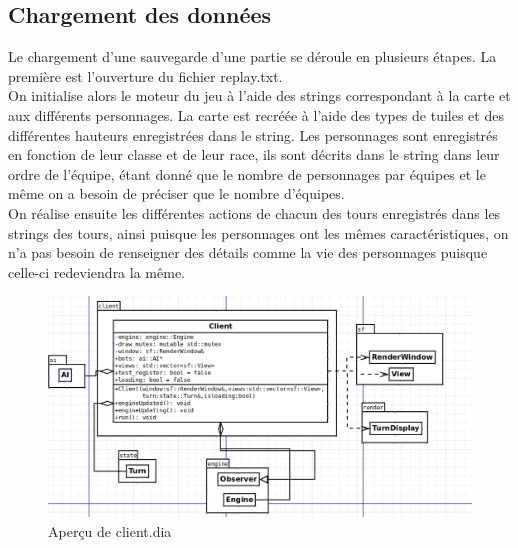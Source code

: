 \subsection{Chargement des données}
Le chargement d'une sauvegarde d'une partie se déroule en 
plusieurs étapes. La première est l'ouverture du fichier 
replay.txt.
\\
On initialise alors le moteur du jeu à l'aide des strings 
correspondant à la carte et aux différents personnages. La 
carte est recréée à l'aide des types de tuiles et des 
différentes hauteurs enregistrées dans le string. Les 
personnages sont enregistrés en fonction de leur classe et 
de leur race, ils sont décrits dans le string dans leur 
ordre de l'équipe, étant donné que le nombre de personnages 
par équipes et le même on a besoin de préciser que le nombre 
d'équipes.
\\
On réalise ensuite les différentes actions de chacun des 
tours enregistrés dans les strings des tours, ainsi puisque 
les personnages ont les mêmes caractéristiques, on n'a pas 
besoin de renseigner des détails comme la vie des 
personnages puisque celle-ci redeviendra la même.


\begin{figure}[H]
\includegraphics[width=\linewidth]{images/client_dia.png}
\centering
\caption{Aperçu de client.dia}
\label{fig:img6}
\end{figure}
\newpage
